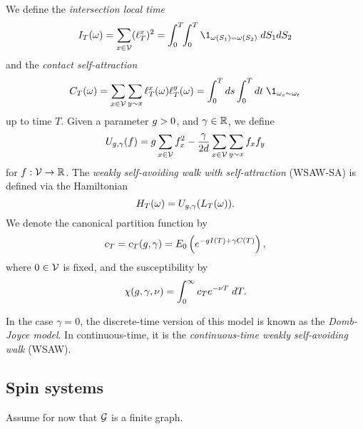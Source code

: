 We define the \emph{intersection local time}
\begin{equation}
\label{e:ITdef}
I_T(\omega) = \sum_{x\in\vertices} (\lt^x_T)^2
  =
\int_0^T \!\! \int_0^T \1_{\omega(S_1)=\omega(S_2)} \; dS_1 dS_2
\end{equation}
and the \emph{contact self-attraction}
\begin{equation}
\label{e:CTdef}
C_T(\omega) =
  \sum_{x \in \vertices} \sum_{y \sim x} \lt_T^x(\omega) \lt_T^y(\omega)
  = \int_0^T ds \int_0^T dt \; \1_{\omega_{s} \sim \omega_{t}}
\end{equation}
up to time $T$.
Given a parameter $g > 0$,
and $\gamma \in {\mathbb R}$, we define
\begin{equation}
\label{e:Udef-neg}
U_{g,\gamma}(f)
=
g \sum_{x\in\mathcal{V}} f_x^2
- \frac{\gamma}{2d}
\sum_{x\in\mathcal{V}} \sum_{y \sim x} f_x f_y
\end{equation}
for $f : \mathcal{V} \rightarrow {\mathbb R}$.
The \emph{weakly self-avoiding walk with self-attraction} (WSAW-SA) is defined via
the Hamiltonian
\begin{equation}
H_T(\omega) = U_{g,\gamma}(L_T(\omega)).
\end{equation}
We denote the canonical partition function by
\begin{equation}
c_T = c_T(g, \gamma) = E_0 \left( e^{-g I(T) + \gamma C(T)} \right),
\end{equation}
where $0 \in \mathcal{V}$ is fixed, and the susceptibility by
\begin{equation}
\chi(g, \gamma, \nu) = \int_0^\infty c_T e^{-\nu T} \; dT.
\end{equation}

In the case $\gamma = 0$, the discrete-time version of this model is known as
the \emph{Domb-Joyce model}. In continuous-time, it is the \emph{continuous-time
weakly self-avoiding walk} (WSAW).


\subsection{Spin systems}

Assume for now that $\mathcal{G}$ is a finite graph.

